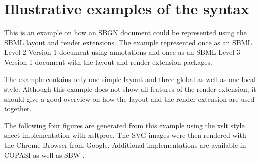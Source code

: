 
\section{Illustrative examples of the \Render syntax}
\label{examples}


This is an example on how an SBGN document could be represented using the SBML layout and render extensions. The example represented once as an SBML Level 2 Version 1 document using annotations and once as an SBML Level 3 Version 1 document with the layout and render extension packages.

The example contains only one simple layout and three global as well as one local style.
Although this example does not show all features of the render extension, it should give a good overview on how the layout and the render extension are used together.

The following four figures are generated from this example using the xslt style sheet implementation with xsltproc.
The SVG images were then rendered with the Chrome Browser from Google. Additional implementations are available in 
COPASI \citep{copasi} as well as SBW \citep{sbw}.

